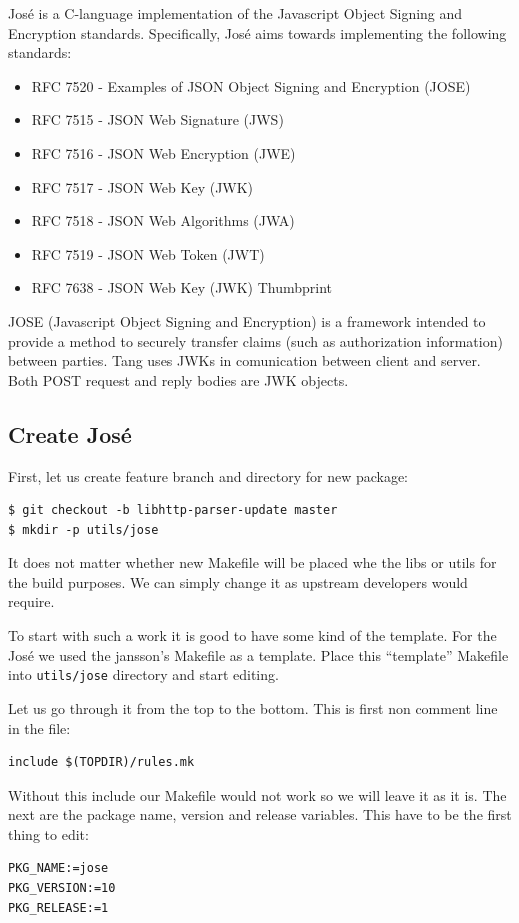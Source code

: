 José is a C-language implementation of the Javascript Object Signing and Encryption standards.
Specifically, José aims towards implementing the following standards:
\begin{itemize}
    \item RFC 7520 - Examples of JSON Object Signing and Encryption (JOSE) \cite{RFC7520}
    \item RFC 7515 - JSON Web Signature (JWS)        \cite{RFC7515}
    \item RFC 7516 - JSON Web Encryption (JWE)       \cite{RFC7516}
    \item RFC 7517 - JSON Web Key (JWK)              \cite{RFC7517}
    \item RFC 7518 - JSON Web Algorithms (JWA)       \cite{RFC7518}
    \item RFC 7519 - JSON Web Token (JWT)            \cite{RFC7519}
    \item RFC 7638 - JSON Web Key (JWK) Thumbprint   \cite{RFC7638}
\end{itemize}

JOSE (Javascript Object Signing and Encryption) is a framework intended to provide a method to securely transfer claims (such as authorization information) between parties.
Tang uses JWKs in comunication between client and server.
Both POST request and reply bodies are JWK objects\cite{jose_prog}.



\subsection{Create José}\label{jose}

First, let us create feature branch and directory for new package:
\begin{lstlisting}[columns=fixed,basicstyle=\ttfamily\footnotesize,tabsize=4,backgroundcolor=\color{yellow!10}]
$ git checkout -b libhttp-parser-update master
$ mkdir -p utils/jose
\end{lstlisting}
It does not matter whether new Makefile will be placed whe the libs or utils for the build purposes.
We can simply change it as upstream developers would require.

To start with such a work it is good to have some kind of the template.
For the José we used the jansson's Makefile as a template.
Place this “template” Makefile into {\tt utils/jose} directory and start editing.

Let us go through it from the top to the bottom.
This is first non comment line in the file:
\begin{lstlisting}[columns=fixed,basicstyle=\ttfamily\footnotesize,tabsize=4,backgroundcolor=\color{yellow!10}]
include $(TOPDIR)/rules.mk
\end{lstlisting}
Without this include our Makefile would not work so we will leave it as it is.
The next are the package name, version and release variables.
This have to be the first thing to edit:
\begin{lstlisting}[columns=fixed,basicstyle=\ttfamily\footnotesize,tabsize=4,backgroundcolor=\color{yellow!10}]
PKG_NAME:=jose
PKG_VERSION:=10
PKG_RELEASE:=1
\end{lstlisting}

